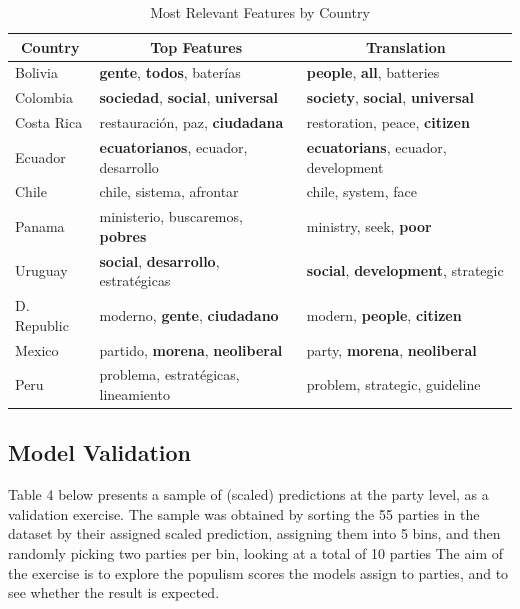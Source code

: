 \documentclass[12pt,letterpaper]{article}
\begin{document}
	\begin{table}[H]
		\centering
		\caption{Most Relevant Features by Country}
		\begin{tabular}{|l|l|l|}
			\hline
			\multicolumn{1}{|c|}{\textbf{Country}} & \multicolumn{1}{c|}{\textbf{Top Features}} & \multicolumn{1}{c|}{\textbf{Translation}} \\
			\hline
			Bolivia     & \textbf{gente}, \textbf{todos}, baterías          & \textbf{people}, \textbf{all}, batteries \\
			Colombia    & \textbf{sociedad}, \textbf{social}, \textbf{universal}     & \textbf{society}, \textbf{social}, \textbf{universal} \\
			Costa Rica  & restauración, paz, \textbf{ciudadana}    & restoration, peace, \textbf{citizen} \\
			Ecuador     & \textbf{ecuatorianos}, ecuador, desarrollo & \textbf{ecuatorians}, ecuador, development \\
			Chile       & chile, sistema, afrontar        & chile, system, face \\
			Panama      & ministerio, buscaremos, \textbf{pobres}  & ministry, seek, \textbf{poor} \\
			Uruguay     & \textbf{social}, \textbf{desarrollo}, estratégicas & \textbf{social}, \textbf{development}, strategic \\
			D. Republic & moderno, \textbf{gente}, \textbf{ciudadano}       & modern, \textbf{people}, \textbf{citizen} \\
			Mexico      & partido, \textbf{morena}, \textbf{neoliberal}     & party, \textbf{morena}, \textbf{neoliberal} \\
			Peru        & problema, estratégicas, lineamiento & problem, strategic, guideline \\
			\hline
		\end{tabular}
	\end{table}

\vspace{.25cm}
\subsection{Model Validation}

\vspace{.25cm}
\noindent Table 4 below presents a sample of (scaled) predictions at the party level, as a validation exercise. The sample was obtained by sorting the 55 parties in the dataset by their assigned scaled prediction, assigning them into 5 bins, and then randomly picking two parties per bin, looking at a total of 10 parties The aim of the exercise is to explore the populism scores the models assign to parties, and to see whether the result is expected. 
\end{document}
